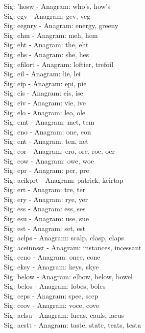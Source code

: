 Sig: {'hosw} - Anagram: who's, how's \\
Sig: {egv} - Anagram: gev, veg \\
Sig: {eegnry} - Anagram: energy, greeny \\
Sig: {ehm} - Anagram: meh, hem \\
Sig: {eht} - Anagram: the, eht \\
Sig: {ehs} - Anagram: she, hes \\
Sig: {efilort} - Anagram: loftier, trefoil \\
Sig: {eil} - Anagram: lie, lei \\
Sig: {eip} - Anagram: epi, pie \\
Sig: {eis} - Anagram: eis, ise \\
Sig: {eiv} - Anagram: vie, ive \\
Sig: {elo} - Anagram: leo, ole \\
Sig: {emt} - Anagram: met, tem \\
Sig: {eno} - Anagram: one, eon \\
Sig: {ent} - Anagram: ten, net \\
Sig: {eor} - Anagram: ero, ore, roe, oer \\
Sig: {eow} - Anagram: owe, woe \\
Sig: {epr} - Anagram: per, pre \\
Sig: {acikprt} - Anagram: patrick, kcirtap \\
Sig: {ert} - Anagram: tre, ter \\
Sig: {ery} - Anagram: rye, yer \\
Sig: {ess} - Anagram: ess, ses \\
Sig: {esu} - Anagram: use, sue \\
Sig: {est} - Anagram: set, est \\
Sig: {aclps} - Anagram: scalp, clasp, claps \\
Sig: {aceinnsst} - Anagram: instances, incessant \\
Sig: {ceno} - Anagram: once, cone \\
Sig: {eksy} - Anagram: keys, skye \\
Sig: {below} - Anagram: elbow, below, bowel \\
Sig: {belos} - Anagram: lobes, boles \\
Sig: {ceps} - Anagram: spec, scep \\
Sig: {ceov} - Anagram: voce, cove \\
Sig: {aclsu} - Anagram: lucas, cauls, lacus \\
Sig: {aestt} - Anagram: taste, state, teats, testa \\
